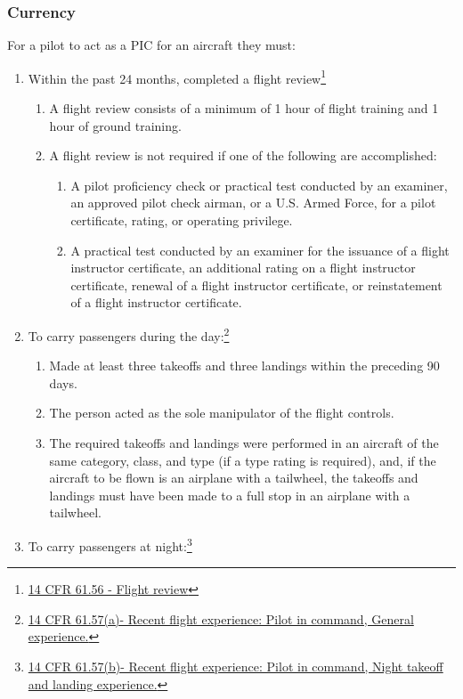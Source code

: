 \documentclass[12pt]{article}
\begin{document}
		\subsubsection{Currency}
			For a pilot to act as a PIC for an aircraft they must:
				\begin{enumerate}
					\item Within the past 24 months, completed a flight review\footnote{\href{https://www.law.cornell.edu/cfr/text/14/61.56}{14 CFR 61.56 - Flight review}}
						\begin{enumerate}
							\item A flight review consists of a minimum of 1 hour of flight training and 1 hour of ground training. 
							\item A flight review is not required if one of the following are accomplished: 
								\begin{enumerate}
									\item A pilot proficiency check or practical test conducted by an examiner, an approved pilot check airman, or a U.S. Armed Force, for a pilot certificate, rating, or operating privilege.
									\item A practical test conducted by an examiner for the issuance of a flight instructor certificate, an additional rating on a flight instructor certificate, renewal of a flight instructor certificate, or reinstatement of a flight instructor certificate.
								\end{enumerate}
						\end{enumerate}
					\item To carry passengers during the day:\footnote{\href{https://www.law.cornell.edu/cfr/text/14/61.57}{14 CFR 61.57(a)- Recent flight experience: Pilot in command, General experience.}}
						\begin{enumerate}
							\item Made at least three takeoffs and three landings within the preceding 90 days.
							\item The person acted as the sole manipulator of the flight controls.
							\item  The required takeoffs and landings were performed in an aircraft of the same category, class, and type (if a type rating is required), and, if the aircraft to be flown is an airplane with a tailwheel, the takeoffs and landings must have been made to a full stop in an airplane with a tailwheel.
						\end{enumerate}
					\item To carry passengers at night:\footnote{\href{https://www.law.cornell.edu/cfr/text/14/61.57}{14 CFR 61.57(b)- Recent flight experience: Pilot in command, Night takeoff and landing experience.}}

\end{enumerate}
\end{document}
